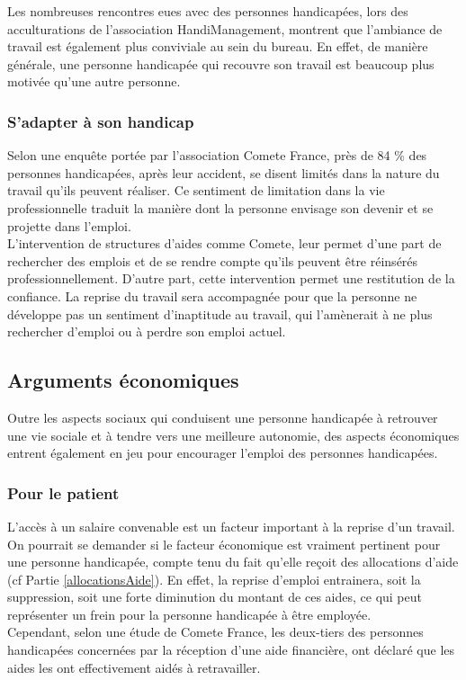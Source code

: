 Les nombreuses rencontres eues avec des personnes handicapées, lors des acculturations de l'association HandiManagement, montrent que l'ambiance de travail est également plus conviviale au sein du bureau. En effet, de manière générale, une personne handicapée qui recouvre son travail est beaucoup plus motivée qu'une autre personne.

\subsubsection{S'adapter à son handicap}
Selon une enquête portée par l'association Comete France, près de 84 \% des personnes handicapées, après leur accident, se disent limités dans la nature du travail qu'ils peuvent réaliser. Ce sentiment de limitation dans la vie professionnelle traduit la manière dont la personne envisage son devenir et se projette dans l'emploi.\\

L'intervention de structures d'aides comme Comete, leur permet d'une part de rechercher des emplois et de se rendre compte qu'ils peuvent être réinsérés professionnellement. D'autre part, cette intervention permet une restitution de la confiance. 
La reprise du travail sera accompagnée pour que la personne ne développe pas un sentiment d'inaptitude au travail, qui l'amènerait à ne plus rechercher d'emploi ou à perdre son emploi actuel.


\subsection{Arguments économiques}

Outre les aspects sociaux qui conduisent une personne handicapée à retrouver une vie sociale et à tendre vers une meilleure autonomie, des aspects économiques entrent également en jeu pour encourager l'emploi des personnes handicapées.

\subsubsection{Pour le patient}
L'accès à un salaire convenable est un facteur important à la reprise d'un travail.\\

On pourrait se demander si le facteur économique est vraiment pertinent pour une personne handicapée, compte tenu du fait qu'elle reçoit des allocations d'aide (cf Partie \ref{allocationsAide}). En effet, la reprise d'emploi entrainera, soit la suppression, soit une forte diminution du montant de ces aides, ce qui peut représenter un frein pour la personne handicapée à être employée.\\
Cependant, selon une étude de Comete France, les deux-tiers des personnes handicapées concernées par la réception d'une aide financière, ont déclaré que les aides les ont effectivement aidés à retravailler.\\


